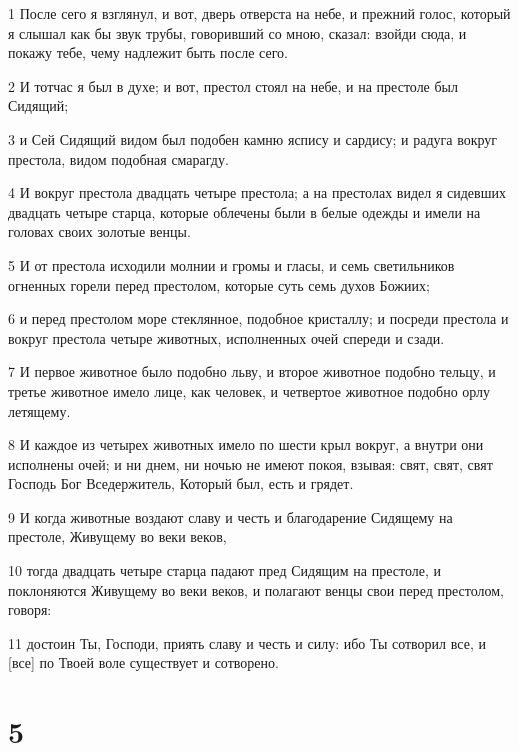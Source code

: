 \par 1 После сего я взглянул, и вот, дверь отверста на небе, и прежний голос, который я слышал как бы звук трубы, говоривший со мною, сказал: взойди сюда, и покажу тебе, чему надлежит быть после сего.
\par 2 И тотчас я был в духе; и вот, престол стоял на небе, и на престоле был Сидящий;
\par 3 и Сей Сидящий видом был подобен камню яспису и сардису; и радуга вокруг престола, видом подобная смарагду.
\par 4 И вокруг престола двадцать четыре престола; а на престолах видел я сидевших двадцать четыре старца, которые облечены были в белые одежды и имели на головах своих золотые венцы.
\par 5 И от престола исходили молнии и громы и гласы, и семь светильников огненных горели перед престолом, которые суть семь духов Божиих;
\par 6 и перед престолом море стеклянное, подобное кристаллу; и посреди престола и вокруг престола четыре животных, исполненных очей спереди и сзади.
\par 7 И первое животное было подобно льву, и второе животное подобно тельцу, и третье животное имело лице, как человек, и четвертое животное подобно орлу летящему.
\par 8 И каждое из четырех животных имело по шести крыл вокруг, а внутри они исполнены очей; и ни днем, ни ночью не имеют покоя, взывая: свят, свят, свят Господь Бог Вседержитель, Который был, есть и грядет.
\par 9 И когда животные воздают славу и честь и благодарение Сидящему на престоле, Живущему во веки веков,
\par 10 тогда двадцать четыре старца падают пред Сидящим на престоле, и поклоняются Живущему во веки веков, и полагают венцы свои перед престолом, говоря:
\par 11 достоин Ты, Господи, приять славу и честь и силу: ибо Ты сотворил все, и [все] по Твоей воле существует и сотворено.

\chapter{5}

